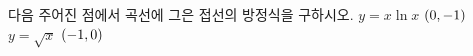다음 주어진 점에서 곡선에 그은 접선의 방정식을 구하시오.
 $y=x\ln x$ \quad $(0{,}\mkern3mu\mathopen{}-1)$
 $y=\sqrt{x}$ \quad $(-1{,}\mkern3mu\mathopen{}0)$
